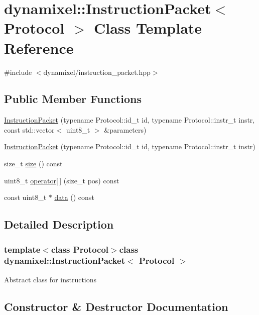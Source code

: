 \hypertarget{classdynamixel_1_1_instruction_packet}{}\section{dynamixel\+:\+:Instruction\+Packet$<$ Protocol $>$ Class Template Reference}
\label{classdynamixel_1_1_instruction_packet}


{\ttfamily \#include $<$dynamixel/instruction\+\_\+packet.\+hpp$>$}

\subsection*{Public Member Functions}
\begin{DoxyCompactItemize}
\item 
\hyperlink{classdynamixel_1_1_instruction_packet_ae625382db5cdf81fae590ce1333876fc}{Instruction\+Packet} (typename Protocol\+::id\+\_\+t id, typename Protocol\+::instr\+\_\+t instr, const std\+::vector$<$ uint8\+\_\+t $>$ \&parameters)
\item 
\hyperlink{classdynamixel_1_1_instruction_packet_acf0044f4cf51aa48cff9309dea20dfcb}{Instruction\+Packet} (typename Protocol\+::id\+\_\+t id, typename Protocol\+::instr\+\_\+t instr)
\item 
size\+\_\+t \hyperlink{classdynamixel_1_1_instruction_packet_ae4fc2dccdf71efe15934fce93e1b7222}{size} () const 
\item 
uint8\+\_\+t \hyperlink{classdynamixel_1_1_instruction_packet_a3558052abebd5412847bb2c2652f2897}{operator\mbox{[}$\,$\mbox{]}} (size\+\_\+t pos) const 
\item 
const uint8\+\_\+t $\ast$ \hyperlink{classdynamixel_1_1_instruction_packet_a9a642ac2e80dc38172166b0508101bb8}{data} () const 
\end{DoxyCompactItemize}


\subsection{Detailed Description}
\subsubsection*{template$<$class Protocol$>$class dynamixel\+::\+Instruction\+Packet$<$ Protocol $>$}

Abstract class for instructions 

\subsection{Constructor \& Destructor Documentation}
\hypertarget{classdynamixel_1_1_instruction_packet_ae625382db5cdf81fae590ce1333876fc}{}
